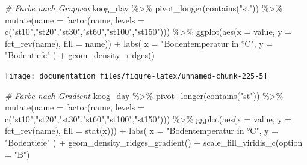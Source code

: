 \documentclass[
]{article}
\newenvironment{Shaded}{\begin{snugshade}}{\end{snugshade}}
\newcommand{\AttributeTok}[1]{\textcolor[rgb]{0.77,0.63,0.00}{#1}}
\newcommand{\CommentTok}[1]{\textcolor[rgb]{0.56,0.35,0.01}{\textit{#1}}}
\newcommand{\FunctionTok}[1]{\textcolor[rgb]{0.00,0.00,0.00}{#1}}
\newcommand{\NormalTok}[1]{#1}
\newcommand{\SpecialCharTok}[1]{\textcolor[rgb]{0.00,0.00,0.00}{#1}}
\newcommand{\StringTok}[1]{\textcolor[rgb]{0.31,0.60,0.02}{#1}}
\begin{document}
\begin{Shaded}
\begin{Highlighting}[]
\CommentTok{\# Farbe nach Gruppen}
\NormalTok{koog\_day }\SpecialCharTok{\%\textgreater{}\%}
  \FunctionTok{pivot\_longer}\NormalTok{(}\FunctionTok{contains}\NormalTok{(}\StringTok{"st"}\NormalTok{)) }\SpecialCharTok{\%\textgreater{}\%}
  \FunctionTok{mutate}\NormalTok{(}\AttributeTok{name =} \FunctionTok{factor}\NormalTok{(name, }\AttributeTok{levels =} \FunctionTok{c}\NormalTok{(}\StringTok{"st10"}\NormalTok{,}\StringTok{"st20"}\NormalTok{,}\StringTok{"st30"}\NormalTok{,}\StringTok{"st60"}\NormalTok{,}\StringTok{"st100"}\NormalTok{,}\StringTok{"st150"}\NormalTok{))) }\SpecialCharTok{\%\textgreater{}\%}
  \FunctionTok{ggplot}\NormalTok{(}\FunctionTok{aes}\NormalTok{(}\AttributeTok{x =}\NormalTok{ value, }\AttributeTok{y =} \FunctionTok{fct\_rev}\NormalTok{(name), }\AttributeTok{fill =}\NormalTok{ name)) }\SpecialCharTok{+}
  \FunctionTok{labs}\NormalTok{(}
    \AttributeTok{x =} \StringTok{"Bodentemperatur in °C"}\NormalTok{, }
    \AttributeTok{y =} \StringTok{"Bodentiefe"}
\NormalTok{  ) }\SpecialCharTok{+}
  \FunctionTok{geom\_density\_ridges}\NormalTok{()}
\end{Highlighting}
\end{Shaded}

\begin{center}\texttt{[image: documentation\_files/figure-latex/unnamed-chunk-225-5]} \end{center}

\begin{Shaded}
\begin{Highlighting}[]
\CommentTok{\# Farbe nach Gradient}
\NormalTok{koog\_day }\SpecialCharTok{\%\textgreater{}\%}
  \FunctionTok{pivot\_longer}\NormalTok{(}\FunctionTok{contains}\NormalTok{(}\StringTok{"st"}\NormalTok{)) }\SpecialCharTok{\%\textgreater{}\%}
  \FunctionTok{mutate}\NormalTok{(}\AttributeTok{name =} \FunctionTok{factor}\NormalTok{(name, }\AttributeTok{levels =} \FunctionTok{c}\NormalTok{(}\StringTok{"st10"}\NormalTok{,}\StringTok{"st20"}\NormalTok{,}\StringTok{"st30"}\NormalTok{,}\StringTok{"st60"}\NormalTok{,}\StringTok{"st100"}\NormalTok{,}\StringTok{"st150"}\NormalTok{))) }\SpecialCharTok{\%\textgreater{}\%}
  \FunctionTok{ggplot}\NormalTok{(}\FunctionTok{aes}\NormalTok{(}\AttributeTok{x =}\NormalTok{ value, }\AttributeTok{y =} \FunctionTok{fct\_rev}\NormalTok{(name), }\AttributeTok{fill =} \FunctionTok{stat}\NormalTok{(x))) }\SpecialCharTok{+}
  \FunctionTok{labs}\NormalTok{(}
    \AttributeTok{x =} \StringTok{"Bodentemperatur in °C"}\NormalTok{, }
    \AttributeTok{y =} \StringTok{"Bodentiefe"}
\NormalTok{  ) }\SpecialCharTok{+}
  \FunctionTok{geom\_density\_ridges\_gradient}\NormalTok{() }\SpecialCharTok{+}
  \FunctionTok{scale\_fill\_viridis\_c}\NormalTok{(}\AttributeTok{option =} \StringTok{"B"}\NormalTok{)}
\end{Highlighting}
\end{Shaded}
\end{document}
